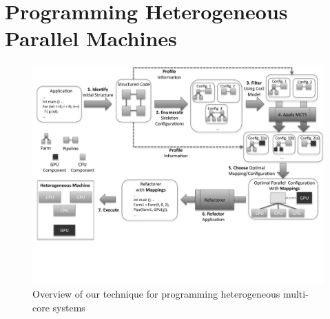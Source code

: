 \documentclass[smallextended]{svjour3}
\begin{document}
\section{Programming Heterogeneous Parallel Machines} \label{sec:methodology}
\begin{figure}[t]
\begin{center}
\includegraphics[width=1\linewidth]{figures/methodology.pdf}
\caption{Overview of our technique for programming heterogeneous multi-core systems}
\label{overview}
\end{center}
\end{figure}
\end{document}
